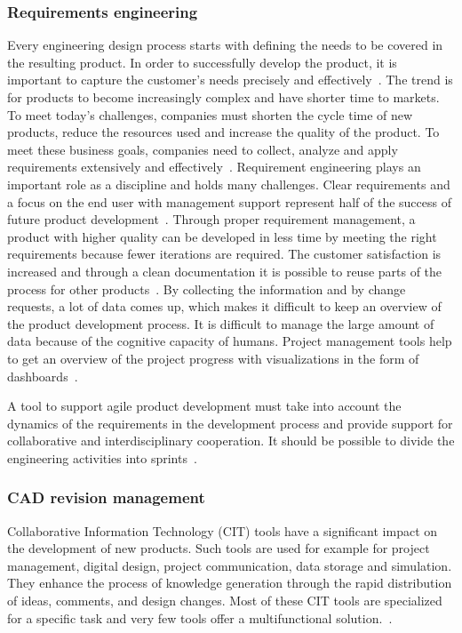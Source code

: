     \subsubsection*{Requirements engineering}
    Every engineering design process starts with defining the needs to be covered in the resulting product. In order to successfully develop the product, it is important to capture the customer's needs precisely and effectively~\cite{liu2012scenario}.
    The trend is for products to become increasingly complex and have shorter time to markets.
    To meet today's challenges, companies must shorten the cycle time of new products, reduce the resources used and increase the quality of the product. To meet these business goals, companies need to collect, analyze and apply requirements extensively and effectively~\cite{Ahti2005}.
    Requirement engineering plays an important role as a discipline and holds many challenges. Clear requirements and a focus on the end user with management support represent half of the success of future product development~\cite{6226784}.
    Through proper requirement management, a product with higher quality can be developed in less time by meeting the right requirements because fewer iterations are required. The customer satisfaction is increased and through a clean documentation it is possible to reuse parts of the process for other products~\cite{BAXTER2008585}.
    By collecting the information and by change requests, a lot of data comes up, which makes it difficult to keep an overview of the product development process. It is difficult to manage the large amount of data because of the cognitive capacity of humans. Project management tools help to get an overview of the project progress with visualizations in the form of dashboards~\cite{RICHTER2020271}.

    A tool to support agile product development must take into account the dynamics of the requirements in the development process and provide support for collaborative and interdisciplinary cooperation. It should be possible to divide the engineering activities into sprints~\cite{liu2012scenario}.



    \subsubsection*{CAD revision management}
    Collaborative Information Technology (CIT) 
    tools have a significant impact on the development of new products. 
    Such tools are used for example for project management, digital design, project communication, data storage and simulation. 
    They enhance the process of knowledge generation through the rapid distribution of ideas, comments, and design changes. Most of these CIT tools are specialized for a specific task and very few tools offer a multifunctional solution.~\cite{MarionTucker}. 

